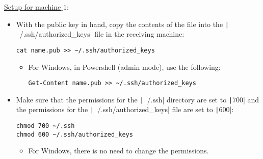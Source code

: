 \underline{\underline{Setup for machine$\_1$}}:

\begin{itemize}
    \item With the public key in hand, copy the contents of the file into the
    \texttt|~/.ssh/authorized_keys| file in the receiving machine:
    \begin{verbatim}
cat name.pub >> ~/.ssh/authorized_keys
    \end{verbatim}
    \begin{itemize}
        \item For Windows, in Powershell (admin mode), use the following:
        \begin{verbatim}
Get-Content name.pub >> ~/.ssh/authorized_keys
        \end{verbatim}
    \end{itemize}
    \item Make sure that the permissions for the \texttt|~/.ssh|
    directory are set to \texttt|700| and the permissions for the
    \texttt|~/.ssh/authorized_keys| file are set to
    \texttt|600|:
    \begin{verbatim}
chmod 700 ~/.ssh
chmod 600 ~/.ssh/authorized_keys
    \end{verbatim}
    \begin{itemize}
        \item For Windows, there is no need to change the permissions.
    \end{itemize}
\end{itemize}